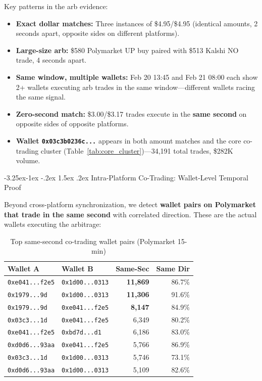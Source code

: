 \documentclass[11pt,a4paper]{article}
\makeatletter
\renewcommand\subsection{\@startsection{subsection}{2}{\z@}%
  {-3.25ex\@plus -1ex \@minus -.2ex}%
  {1.5ex \@plus .2ex}%
  {\normalfont\large\bfseries}}
\makeatother
\begin{document}
Key patterns in the arb evidence:
\begin{itemize}[nosep]
    \item \textbf{Exact dollar matches:} Three instances of \$4.95/\$4.95 (identical amounts, 2 seconds apart, opposite sides on different platforms).
    \item \textbf{Large-size arb:} \$580 Polymarket UP buy paired with \$513 Kalshi NO trade, 4 seconds apart.
    \item \textbf{Same window, multiple wallets:} Feb 20 13:45 and Feb 21 08:00 each show 2+ wallets executing arb trades in the same window---different wallets racing the same signal.
    \item \textbf{Zero-second match:} \$3.00/\$3.17 trades execute in the \textbf{same second} on opposite sides of opposite platforms.
    \item \textbf{Wallet \texttt{0x03c3b0236c...}} appears in both amount matches and the core co-trading cluster (Table~\ref{tab:core_cluster})---34,191 total trades, \$282K volume.
\end{itemize}

\subsection{Intra-Platform Co-Trading: Wallet-Level Temporal Proof}

Beyond cross-platform synchronization, we detect \textbf{wallet pairs on Polymarket that trade in the same second} with correlated direction. These are the actual wallets executing the arbitrage:

\begin{table}[H]
\centering
\caption{Top same-second co-trading wallet pairs (Polymarket 15-min)}
\label{tab:cotrade}
\small
\begin{tabular}{@{}llrr@{}}
\toprule
\textbf{Wallet A} & \textbf{Wallet B} & \textbf{Same-Sec} & \textbf{Same Dir} \\
\midrule
\texttt{0xe041...f2e5} & \texttt{0x1d00...0313} & \textbf{11,869} & 86.7\% \\
\texttt{0x1979...9d} & \texttt{0x1d00...0313} & \textbf{11,306} & 91.6\% \\
\texttt{0x1979...9d} & \texttt{0xe041...f2e5} & \textbf{8,147} & 84.9\% \\
\texttt{0x03c3...1d} & \texttt{0xe041...f2e5} & 6,349 & 80.2\% \\
\texttt{0xe041...f2e5} & \texttt{0xbd7d...d1} & 6,186 & 83.0\% \\
\texttt{0xd0d6...93aa} & \texttt{0xe041...f2e5} & 5,766 & 86.9\% \\
\texttt{0x03c3...1d} & \texttt{0x1d00...0313} & 5,746 & 73.1\% \\
\texttt{0xd0d6...93aa} & \texttt{0x1d00...0313} & 5,109 & 82.6\% \\
\bottomrule
\end{tabular}
\end{table}
\end{document}
